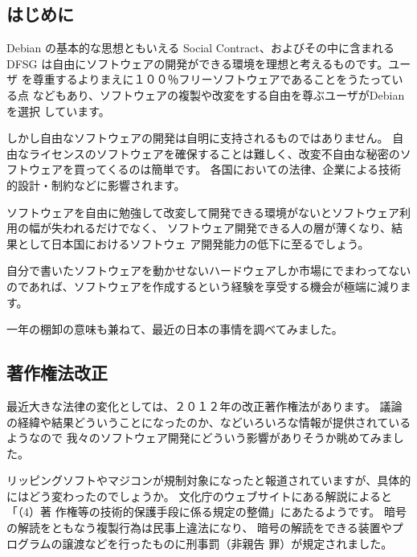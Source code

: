 \documentclass[mingoth,a4paper]{jsarticle}
\begin{document}

\subsection{はじめに}

Debian の基本的な思想ともいえる Social Contract、およびその中に含まれる
DFSG は自由にソフトウェアの開発ができる環境を理想と考えるものです。ユーザ
を尊重するよりまえに１００％フリーソフトウェアであることをうたっている点
などもあり、ソフトウェアの複製や改変をする自由を尊ぶユーザがDebianを選択
しています。

しかし自由なソフトウェアの開発は自明に支持されるものではありません。
自由なライセンスのソフトウェアを確保することは難しく、改変不自由な秘密のソフトウェアを買ってくるのは簡単です。
各国においての法律、企業による技術的設計・制約などに影響されます。

ソフトウェアを自由に勉強して改変して開発できる環境がないとソフトウェア利
用の幅が失われるだけでなく、
ソフトウェア開発できる人の層が薄くなり、結果として日本国におけるソフトウェ
ア開発能力の低下に至るでしょう。

自分で書いたソフトウェアを動かせないハードウェアしか市場にでまわってない
のであれば、ソフトウェアを作成するという経験を享受する機会が極端に減ります。

一年の棚卸の意味も兼ねて、最近の日本の事情を調べてみました。

\subsection{著作権法改正}

最近大きな法律の変化としては、２０１２年の改正著作権法があります。
議論の経緯や結果どういうことになったのか、などいろいろな情報が提供されているようなので
我々のソフトウェア開発にどういう影響がありそうか眺めてみました。

リッピングソフトやマジコンが規制対象になったと報道されていますが、具体的
にはどう変わったのでしょうか。
文化庁のウェブサイトにある解説\cite{bunka-chosaku2012}によると「（4）著
作権等の技術的保護手段に係る規定の整備」にあたるようです。
暗号の解読をともなう複製行為は民事上違法になり、
暗号の解読をできる装置やプログラムの譲渡などを行ったものに刑事罰（非親告
罪）が規定されました。
\end{document}
